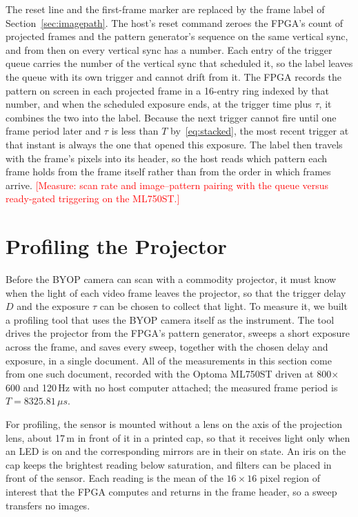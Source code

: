 \documentclass[10pt,journal,compsoc]{IEEEtran}
\newcommand{\SI}[2]{#1\,#2}
\newcommand{\micro}{\ensuremath{\mu}}
\newcommand{\second}{s}\newcommand{\hertz}{Hz}\newcommand{\metre}{m}
\newcommand{\pending}[1]{\textcolor{red}{[#1]}}
\begin{document}
The reset line and the first-frame marker are replaced by the frame label of
Section~\ref{sec:imagepath}. The host's reset command zeroes the FPGA's count of projected frames
and the pattern generator's sequence on the same vertical sync, and from then on every vertical
sync has a number. Each entry of the trigger queue carries the number of the vertical sync that
scheduled it, so the label leaves the queue with its own trigger and cannot drift from it. The
FPGA records the pattern on screen in each projected frame in a 16-entry ring indexed by that
number, and when the scheduled exposure ends, at the trigger time plus $\tau$, it combines the two
into the label. Because the next trigger cannot fire until one frame period later and $\tau$ is
less than $T$ by~\eqref{eq:stacked}, the most recent trigger at that instant is always the one
that opened this exposure. The label then travels with the frame's pixels into its header, so
the host reads which pattern each frame holds from the frame itself rather than from the order in
which frames arrive.
\pending{Measure: scan rate and image--pattern pairing with the queue versus ready-gated
triggering on the ML750ST.}

\section{Profiling the Projector}
\label{sec:profiling}

Before the BYOP camera can scan with a commodity projector, it must know when the light of
each video frame leaves the projector, so that the trigger delay $D$ and the exposure $\tau$
can be chosen to collect that light. To measure it, we built a profiling tool that uses the
BYOP camera itself as the instrument. The tool drives the projector from the FPGA's pattern
generator, sweeps a short exposure across the frame, and saves every sweep, together with the
chosen delay and exposure, in a single document. All of the measurements in this section come
from one such document, recorded with the Optoma ML750ST driven at 800$\times$600 and
\SI{120}{\hertz} with no host computer attached; the measured frame period is
$T=\SI{8325.81}{\micro\second}$.

For profiling, the sensor is mounted without a lens on the axis of the projection lens, about
\SI{17}{\milli\metre} in front of it in a printed cap, so that it receives light only when an LED
is on and the corresponding mirrors are in their on state. An iris on the cap keeps the brightest
reading below saturation, and filters can be placed in front of the sensor. Each reading is the
mean of the $16\times16$ pixel region of interest that the FPGA computes and returns in the frame
header, so a sweep transfers no images.
\end{document}
